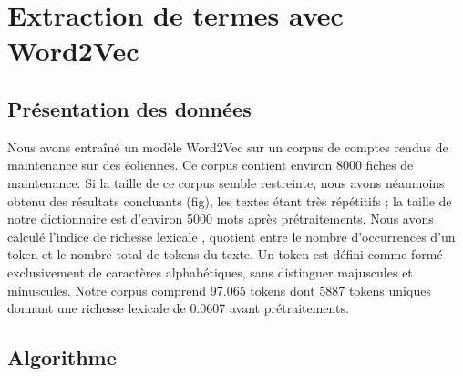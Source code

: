 \section{Extraction de termes avec Word2Vec}

\subsection{Présentation des données}
Nous avons entraîné un modèle Word2Vec sur un corpus de comptes rendus de maintenance sur des éoliennes. Ce corpus contient environ 8000 fiches de maintenance. Si la taille de ce corpus semble restreinte, nous avons néanmoins obtenu des résultats concluants (fig), les textes étant très répétitifs ; la taille de notre dictionnaire est d'environ 5000 mots après prétraitements. Nous avons calculé l'indice de richesse lexicale \cite{McKee2000}, quotient entre le nombre d’occurrences d’un token et le nombre total de tokens du texte. Un token est défini comme formé exclusivement de caractères alphabétiques, sans distinguer majuscules et minuscules. Notre corpus comprend 97.065 tokens dont 5887 tokens uniques donnant une richesse lexicale de 0.0607 avant prétraitements.


\subsection{Algorithme}

